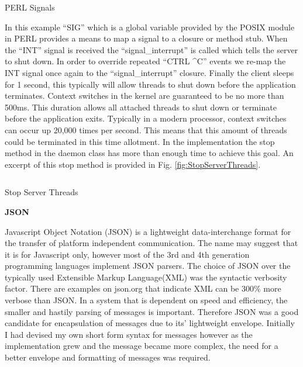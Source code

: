 		\begin{figurehere}
			\inputminted[linenos=true,fontsize=\footnotesize,tabsize=2]{perl}{pages/chapter3/smippets/signals.pl}
			\vspace{-5mm}
			\caption{PERL Signals}
			\label{fig:perlsignals}
		\end{figurehere}
		
		\vspace{3mm}		
		\normalsize
		{
			In this example ``SIG'' which is a global variable provided by the POSIX module in PERL provides a means to map a signal to a closure
			or method stub.  When the ``INT'' signal is received the ``signal\_interrupt'' is called which tells the server to shut down.  
			In order to override repeated ``CTRL \textasciicircum  C'' events we re-map the INT signal once again to the ``signal\_interrupt'' closure.
			Finally the client sleeps for 1 second, this typically will allow threads to shut down before the application terminates.
			\newline
			\newline
			Context switches in the kernel are guaranteed to be no more than 500ms. This duration allows all attached threads
			to shut down or terminate before the application exits.  Typically in a modern processor, context switches can occur up
			20,000 times per second. This means that this amount of threads could be terminated in this time allotment. In the implementation
			the stop method in the daemon class has more than enough time to achieve this goal.  An excerpt of this stop method is provided in Fig. \ref{fig:StopServerThreads}.
		} 
		
		\vspace{2mm}
		\begin{figurehere}
			\inputminted[linenos=true,fontsize=\footnotesize,tabsize=2]{perl}{pages/chapter3/smippets/serverstop.pl}
			\vspace{-4mm}
			\caption{Stop Server Threads}
			\label{fig:StopServerThreads}
		\end{figurehere}
		
\newpage

		\large{\bfseries{JSON}}	
		
		\normalsize
		{		
			Javascript Object Notation (JSON) is a lightweight data-interchange format for the transfer of platform independent communication.  
			The name may suggest that it is for Javascript only, however most of the 3rd and 4th generation programming languages implement JSON parsers.  
			The choice of JSON over the typically used Extensible Markup Language(XML) was the syntactic verbosity factor.  There are examples on json.org that indicate
			XML can be 300\% more verbose than JSON.  In a system that is dependent on speed and efficiency, the smaller and hastily parsing of messages is important.
			Therefore JSON was a good candidate for encapsulation of messages due to its' lightweight envelope.  Initially I had devised my own short form syntax for messages
			however as the implementation grew and the message became more complex, the need for a better envelope and formatting of messages was required.
		}
		
